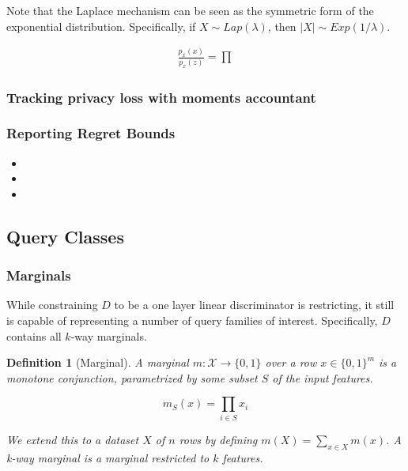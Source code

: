 \documentclass[]{article}
\newcommand{\X}{\mathcal{X}}
\newcommand{\B}{\{0,1\}}
\newtheorem{definition}{Definition}[section]
\theoremstyle{definition}
\begin{document}
Note that the Laplace mechanism can be seen as the symmetric form of the exponential distribution. Specifically, if $X \sim Lap(\lambda)$, then $|X| \sim Exp(1/\lambda)$. 


\begin{align}
    \frac{p_x(x)}{p_x(z)} = \prod
\end{align}

\subsubsection{Tracking privacy loss with moments accountant}




\subsubsection{Reporting Regret Bounds}
\begin{itemize}
    \item {}
    \item {}
    \item {}
\end{itemize}

\subsection{Query Classes}
\subsubsection{Marginals}

While constraining $D$ to be a one layer linear discriminator is restricting, it still is capable of representing a number of query families of interest. Specifically, $D$ contains all $k$-way marginals.

\begin{definition}[Marginal]
    A marginal $m: \X \to \B$ over a row $x \in \{0,1\}^m$ is a monotone conjunction, parametrized by some subset $S$ of the input features.  

    \begin{equation}
        m_S(x) = \prod_{i \in S} x_i
    \end{equation}
    
    We extend this to a dataset $X$ of $n$ rows by defining $m(X) = \sum_{x \in X} m(x)$. A k-way marginal is a marginal restricted to $k$ features.
\end{definition} \cite{DR13}
\end{document}
